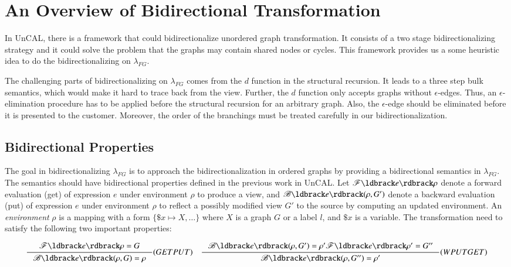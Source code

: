 \documentclass{llncs}
\begin{document}
\section{An Overview of Bidirectional Transformation}\label{sec:overview}

In UnCAL, there is a framework that could bidirectionalize unordered graph transformation. It consists of a two stage bidirectionalizing strategy and it could solve the problem that the graphs may contain shared nodes or cycles. This framework provides us a some heuristic idea to do the bidirectionalizing on $\lambda_{FG}$. 

The challenging parts of bidirectionalizing on $\lambda_{FG}$ comes from the $d$ function in the structural recursion. It leads to a three step bulk semantics, which would make it hard to trace back from the view. Further, the $d$ function only accepts graphs without $\epsilon$-edges. Thus, an $\epsilon$-elimination procedure has to be applied before the structural recursion for an arbitrary graph. Also, the $\epsilon$-edge should be eliminated before it is presented to the customer. Moreover, the order of the branchings must be treated carefully in our bidirectionalization. 

\subsection{Bidirectional Properties}\label{subsec:b-prop}

The goal in bidirectionalizing $\lambda_{FG}$ is to approach the bidirectionalization in ordered graphs by providing a bidirectional semantics in $\lambda_{FG}$. The semantics should have bidirectional properties defined in the previous work in UnCAL. Let $\mathscr{F}\ldbrack e\rdbrack\rho$ denote a forward evaluation (get) of expression $e$ under environment $\rho$ to produce a view, and $\mathscr{B}\ldbrack e\rdbrack(\rho,G')$ denote a backward evaluation (put) of expression $e$ under environment $\rho$ to reflect a possibly modified view $G'$ to the source by computing an updated environment. An \emph{environment} $\rho$ is a mapping with a form $\{\$x\mapsto X,\ldots\}$ where $X$ is a graph $G$ or a label $l$, and $\$x$ is a variable. The transformation need to satisfy the following two important properties:

$$\inference{\mathscr{F}\ldbrack e\rdbrack\rho=G}{\mathscr{B}\ldbrack e\rdbrack(\rho,G)=\rho}(GETPUT)\quad
\inference{\mathscr{B}\ldbrack e\rdbrack(\rho,G')=\rho' \mathscr{F}\ldbrack e\rdbrack\rho'=G''}{\mathscr{B}\ldbrack e\rdbrack(\rho,G'')=\rho'}(WPUTGET)$$
\end{document}
